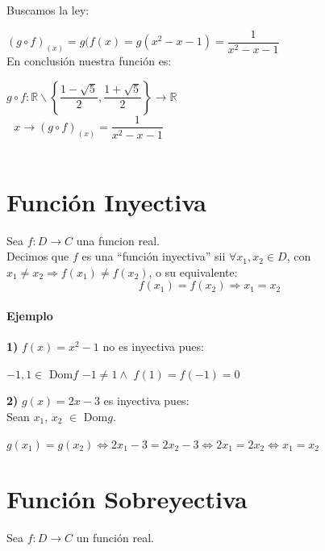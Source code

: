 Buscamos la ley:

\qquad $(g\circ f)_{(x)} = g(f(x) =g(x^2-x-1) = \dfrac{1}{x^2-x-1}$\\

En conclusión nuestra función es:

\begin{center}
$
g\circ f: \mathbb{R} \smallsetminus \left\{ \dfrac{1- \sqrt{5}}{2}, \dfrac{1+ \sqrt{5}}{2}\right\}  \longrightarrow \mathbb{R}$\\
$ $\qquad $ $ \qquad $ $ \qquad $x \longrightarrow (g\circ f)_{(x)}= \dfrac{1}{x^2-x-1}$\\
\qquad\\

\end{center}

\section{Función Inyectiva}

Sea $f : D \longrightarrow C$ una funcion real.\\

Decimos que  $f$ es una ``función inyectiva'' sii $\forall x_1, x_2 \in D$, con $x_1 \neq x_2 \Rightarrow f(x_1) \neq f(x_2)$, o su equivalente:
$$f(x_1)=f(x_2) \Rightarrow x_1=x_2$$ 

\paragraph{Ejemplo}

\qquad \textbf{1)} $f(x)=x^2-1$ no es inyectiva pues:

\begin{center}
$-1,1 \in $ Dom$f$ $ -1 \neq 1 \wedge $ $f(1)=f(-1)=0$ 
\end{center}

\qquad \textbf{2)} $g(x)=2x-3$ es inyectiva pues:\\

Sean $x_1$, $x_2$ $\in$ Dom$g$.
\begin{center}
$ g(x_1)=g(x_2) \Leftrightarrow 2x_1-3=2x_2-3 \Leftrightarrow 2x_1=2x_2 \Leftrightarrow
x_1 = x_2$
\end{center}

\section{Función Sobreyectiva}

Sea $f:D \longrightarrow C$ un función real.\\

